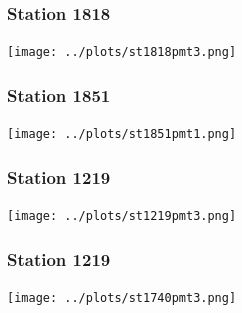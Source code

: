 \documentclass[aspectratio=169]{beamer}
\begin{document}
\begin{frame}
  \frametitle{Station 1818}
  \centering
  \texttt{[image: ../plots/st1818pmt3.png]}
\end{frame}

\begin{frame}
  \frametitle{Station 1851}
  \centering
  \texttt{[image: ../plots/st1851pmt1.png]}
\end{frame}

\begin{frame}
  \frametitle{Station 1219}
  \centering
  \texttt{[image: ../plots/st1219pmt3.png]}
\end{frame}

\begin{frame}
  \frametitle{Station 1219}
  \centering
  \texttt{[image: ../plots/st1740pmt3.png]}
\end{frame}





\end{document}
